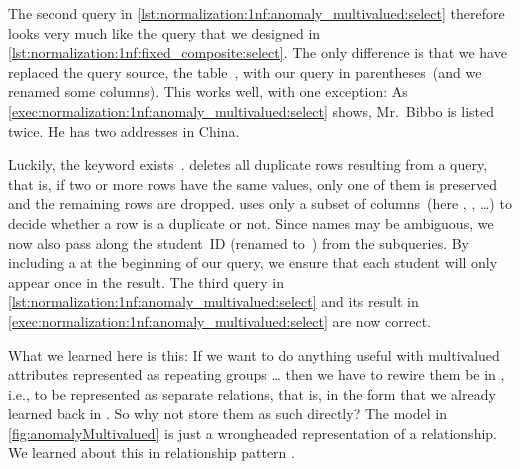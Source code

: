 The second query in \cref{lst:normalization:1nf:anomaly_multivalued:select} therefore looks very much like the query that we designed in \cref{lst:normalization:1nf:fixed_composite:select}.
The only difference is that we have replaced the query source, the table~, with our  query in parentheses~(and we renamed some columns).
This works well, with one exception:
As \cref{exec:normalization:1nf:anomaly_multivalued:select} shows, Mr.~Bibbo is listed twice.
He has two addresses in China.

Luckily, the  keyword exists~\cite{PGDG:PD:SC:S}.
 deletes all duplicate rows resulting from a query, that is, if two or more rows have the same values, only one of them is preserved and the remaining rows are dropped.
 uses only a subset of columns~(here , , \dots) to decide whether a row is a duplicate or not.
Since names may be ambiguous, we now also pass along the student~ID (renamed to~) from the subqueries.
By including a  at the beginning of our query, we ensure that each student will only appear once in the result.
The third query in \cref{lst:normalization:1nf:anomaly_multivalued:select} and its result in \cref{exec:normalization:1nf:anomaly_multivalued:select} are now correct.

What we learned here is this:
If we want to do anything useful with multivalued attributes represented as repeating groups {\dots} then we have to rewire them be in , i.e., to be represented as separate relations, that is, in the form that we already learned back in .
So why not store them as such directly?
The model in \cref{fig:anomalyMultivalued} is just a wrongheaded representation of a  relationship.
We learned about this in relationship pattern .

